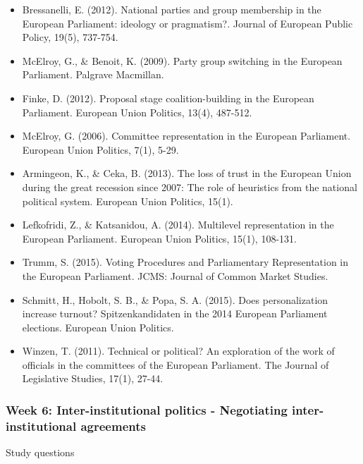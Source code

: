 \begin{itemize}
	\item Bressanelli, E. (2012). National parties and group membership in the European Parliament: ideology or pragmatism?. Journal of European Public Policy, 19(5), 737-754.
	\item McElroy, G., \& Benoit, K. (2009). Party group switching in the European Parliament. Palgrave Macmillan.
	\item Finke, D. (2012). Proposal stage coalition-building in the European Parliament. European Union Politics, 13(4), 487-512.
	\item McElroy, G. (2006). Committee representation in the European Parliament. European Union Politics, 7(1), 5-29.
	\item Armingeon, K., \& Ceka, B. (2013). The loss of trust in the European Union during the great recession since 2007: The role of heuristics from the national political system. European Union Politics, 15(1).
	\item Lefkofridi, Z., \& Katsanidou, A. (2014). Multilevel representation in the European Parliament. European Union Politics, 15(1), 108-131.
	\item Trumm, S. (2015). Voting Procedures and Parliamentary Representation in the European Parliament. JCMS: Journal of Common Market Studies.
	\item Schmitt, H., Hobolt, S. B., \& Popa, S. A. (2015). Does personalization increase turnout? Spitzenkandidaten in the 2014 European Parliament elections. European Union Politics.
	\item Winzen, T. (2011). Technical or political? An exploration of the work of officials in the committees of the European Parliament. The Journal of Legislative Studies, 17(1), 27-44.
\end{itemize}


\subsubsection*{Week 6: Inter-institutional politics - Negotiating inter-institutional agreements}

Study questions

